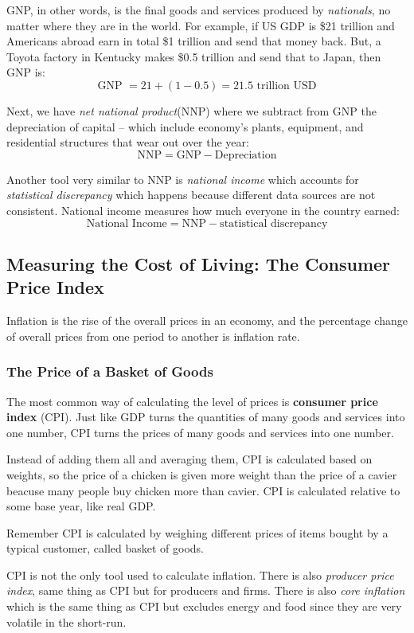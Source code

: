 \documentclass[12pt]{article}
\begin{document}
GNP, in other words, is the final goods and services produced by \textit{nationals}, no matter where they are in the world. For example, if US GDP is \$21 trillion and Americans abroad earn in total \$1 trillion and send that money back. But, a Toyota factory in Kentucky makes \$0.5 trillion and send that to Japan, then GNP is:
$$\text{GNP } = 21 + (1 - 0.5) = \text{21.5 trillion USD}$$

Next, we have \textit{net national product}(NNP) where we subtract from GNP the depreciation of capital -- which include economy's plants, equipment, and residential structures that wear out over the year:
$$\text{NNP} = \text{GNP} - \text{Depreciation}$$ 

Another tool very similar to NNP is \textit{national income} which accounts for \textit{statistical discrepancy} which happens because different data sources are not consistent. National income measures how much everyone in the country earned:
$$\text{National Income} = \text{NNP} - \text{statistical discrepancy}$$


\newpage

\subsection{Measuring the Cost of Living: The Consumer Price Index}

Inflation is the rise of the overall prices in an economy, and the percentage change of overall prices from one period to another is inflation rate.

\subsubsection{The Price of a Basket of Goods}

The most common way of calculating the level of prices is \textbf{consumer price index} (CPI). Just like GDP turns the quantities of many goods and services into one number, CPI turns the prices of many goods and services into one number.

Instead of adding them all and averaging them, CPI is calculated based on weights, so the price of a chicken is given more weight than the price of a cavier beacuse many people buy chicken more than cavier. CPI is calculated relative to some base year, like real GDP.

Remember CPI is calculated by weighing different prices of items bought by a typical customer, called basket of goods.

CPI is not the only tool used to calculate inflation. There is also \textit{producer price index}, same thing as CPI but for producers and firms. There is also \textit{core inflation} which is the same thing as CPI but excludes energy and food since they are very volatile in the short-run.
\end{document}
